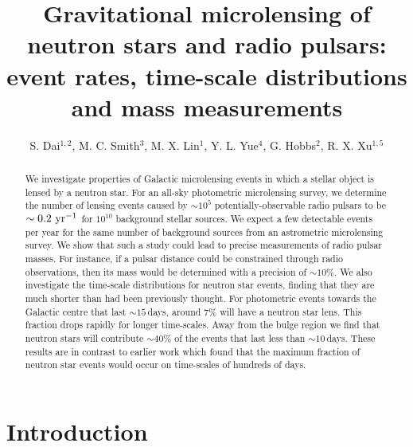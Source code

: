 \documentclass[iop,apj]{emulateapj}
\begin{document}
\title{Gravitational microlensing of neutron stars and radio pulsars:
event rates, time-scale distributions and mass measurements}

\author{S. Dai$^{1,2}$, M. C. Smith$^3$, M. X. Lin$^1$, Y. L. Yue$^4$, G. Hobbs$^2$, R. X. Xu$^{1,5}$}

\begin{abstract}
We investigate properties of Galactic microlensing events in which a
stellar object is lensed by a neutron star.
%
For an all-sky photometric microlensing survey, we determine the
number of lensing events caused by $\sim10^{5}$
potentially-observable radio pulsars to be $\sim0.2\ \rm{yr^{-1}}$ for
$10^{10}$ background stellar sources. We expect a few detectable
events per year for the same number of background sources from an
astrometric microlensing survey.
%
We show that such a study could lead to precise measurements of radio
pulsar masses. For instance, if a pulsar distance could be constrained
through radio observations, then its mass would be determined with a
precision of $\sim10\%$.
%
We also investigate the time-scale distributions for neutron star
events, finding that they are much shorter than had been previously
thought.
%
For photometric events towards the Galactic centre that last
$\sim15$\,days, around 7\% will have a neutron star lens. This
fraction drops rapidly for longer time-scales. Away from the bulge
region we find that neutron stars will contribute $\sim40\%$ of the
events that last less than $\sim10$\,days. These results are in
contrast to earlier work which found that the maximum fraction of 
neutron star events would occur on time-scales of hundreds of days. 
%
\end{abstract}


\section{Introduction}
\end{document}
